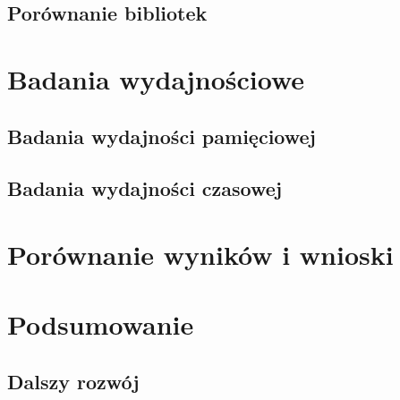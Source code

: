 \documentclass[polish, twoside, 12pt]{mwart}
\begin{document}
\subsection{Porównanie bibliotek}

\section{Badania wydajnościowe}

\subsection{Badania wydajności pamięciowej}

\subsection{Badania wydajności czasowej}

\section{Porównanie wyników i wnioski}

\section{Podsumowanie}

\subsection{Dalszy rozwój}
\end{document}
